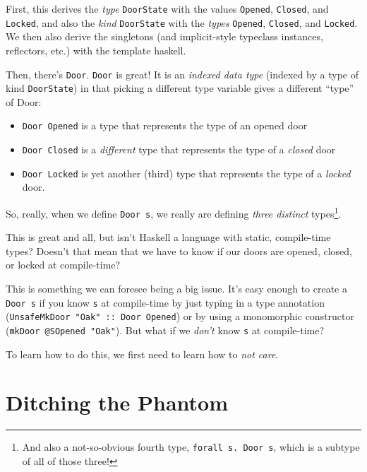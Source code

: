 \documentclass[]{article}
\begin{document}
First, this derives the \emph{type} \texttt{DoorState} with the values
\texttt{Opened}, \texttt{Closed}, and \texttt{Locked}, and also the \emph{kind}
\texttt{DoorState} with the \emph{types} \texttt{\textquotesingle{}Opened},
\texttt{\textquotesingle{}Closed}, and \texttt{\textquotesingle{}Locked}. We
then also derive the singletons (and implicit-style typeclass instances,
reflectors, etc.) with the template haskell.

Then, there's \texttt{Door}. \texttt{Door} is great! It is an \emph{indexed data
type} (indexed by a type of kind \texttt{DoorState}) in that picking a different
type variable gives a different ``type'' of Door:

\begin{itemize}
\tightlist
\item
  \texttt{Door\ \textquotesingle{}Opened} is a type that represents the type of
  an opened door
\item
  \texttt{Door\ \textquotesingle{}Closed} is a \emph{different} type that
  represents the type of a \emph{closed} door
\item
  \texttt{Door\ \textquotesingle{}Locked} is yet another (third) type that
  represents the type of a \emph{locked} door.
\end{itemize}

So, really, when we define \texttt{Door\ s}, we really are defining \emph{three
distinct} types\footnote{And also a not-so-obvious fourth type,
  \texttt{forall\ s.\ Door\ s}, which is a subtype of all of those three!}.

This is great and all, but isn't Haskell a language with static, compile-time
types? Doesn't that mean that we have to know if our doors are opened, closed,
or locked at compile-time?

This is something we can foresee being a big issue. It's easy enough to create a
\texttt{Door\ s} if you know \texttt{s} at compile-time by just typing in a type
annotation (\texttt{UnsafeMkDoor\ "Oak"\ ::\ Door\ \textquotesingle{}Opened}) or
by using a monomorphic constructor (\texttt{mkDoor\ @SOpened\ "Oak"}). But what
if we \emph{don't} know \texttt{s} at compile-time?

To learn how to do this, we first need to learn how to \emph{not care}.

\hypertarget{ditching-the-phantom}{%
\section{Ditching the Phantom}\label{ditching-the-phantom}}
\end{document}

